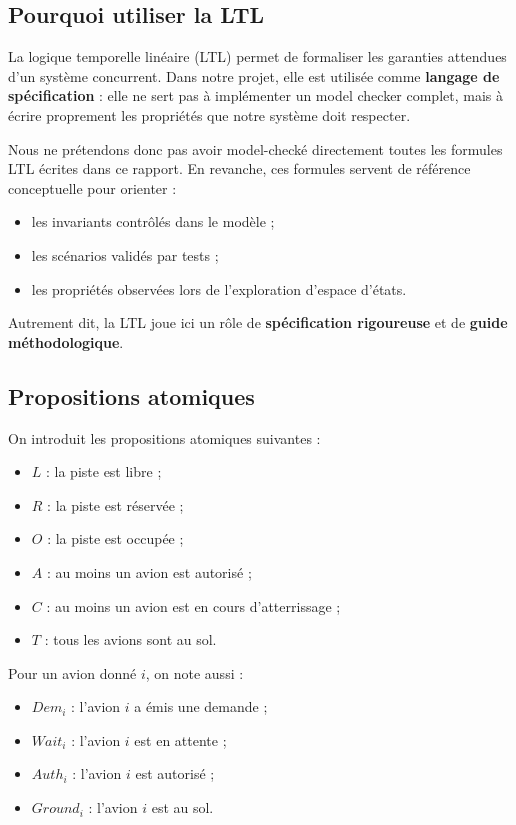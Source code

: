 \documentclass[11pt,a4paper]{article}
\begin{document}
\subsection{Pourquoi utiliser la LTL}

La logique temporelle linéaire (LTL) permet de formaliser les garanties attendues d'un système concurrent. Dans notre projet, elle est utilisée comme \textbf{langage de spécification} : elle ne sert pas à implémenter un model checker complet, mais à écrire proprement les propriétés que notre système doit respecter.

Nous ne prétendons donc pas avoir model-checké directement toutes les formules LTL écrites dans ce rapport. En revanche, ces formules servent de référence conceptuelle pour orienter :
\begin{itemize}
    \item les invariants contrôlés dans le modèle ;
    \item les scénarios validés par tests ;
    \item les propriétés observées lors de l'exploration d'espace d'états.
\end{itemize}

Autrement dit, la LTL joue ici un rôle de \textbf{spécification rigoureuse} et de \textbf{guide méthodologique}.

\subsection{Propositions atomiques}

On introduit les propositions atomiques suivantes :
\begin{itemize}
    \item $L$ : la piste est libre ;
    \item $R$ : la piste est réservée ;
    \item $O$ : la piste est occupée ;
    \item $A$ : au moins un avion est autorisé ;
    \item $C$ : au moins un avion est en cours d'atterrissage ;
    \item $T$ : tous les avions sont au sol.
\end{itemize}

Pour un avion donné $i$, on note aussi :
\begin{itemize}
    \item $Dem_i$ : l'avion $i$ a émis une demande ;
    \item $Wait_i$ : l'avion $i$ est en attente ;
    \item $Auth_i$ : l'avion $i$ est autorisé ;
    \item $Ground_i$ : l'avion $i$ est au sol.
\end{itemize}
\end{document}
